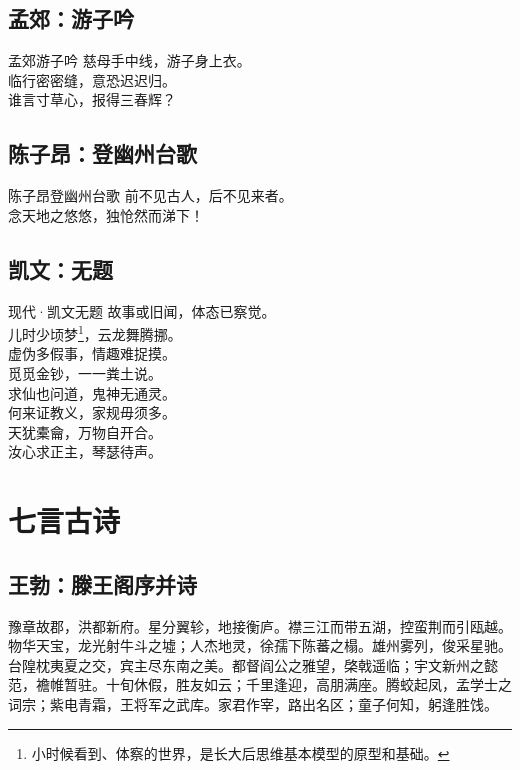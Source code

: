 \documentclass[12pt,oneside,a5paper]{book}
\begin{document}
\chapter{孟郊：游子吟}
\begin{poemzh}{孟郊}{游子吟}
慈母手中线，游子身上衣。\\
临行密密缝，意恐迟迟归。\\
谁言寸草心，报得三春辉？\\ 
\end{poemzh}

\chapter{陈子昂：登幽州台歌}
\begin{poemzh}{陈子昂}{登幽州台歌}
前不见古人，后不见来者。\\
念天地之悠悠，独怆然而涕下！\\ 
\end{poemzh}

\chapter*{凯文：无题}
\begin{poemzh}{现代·凯文}{无题}
故事或旧闻，体态已察觉。\\
儿时少顷梦\footnote[1]{小时候看到、体察的世界，是长大后思维基本模型的原型和基础。}，云龙舞腾挪。\\
虚伪多假事，情趣难捉摸。\\
觅觅金钞，一一粪土说。\\
求仙也问道，鬼神无通灵。\\
何来证教义，家规毋须多。\\
天犹橐龠，万物自开合。\\
汝心求正主，琴瑟待声。\\
\end{poemzh}

\part{七言古诗}

\chapter{王勃：滕王阁序并诗}

豫章故郡，洪都新府。星分翼轸，地接衡庐。襟三江而带五湖，控蛮荆而引瓯越。物华天宝，龙光射牛斗之墟；人杰地灵，徐孺下陈蕃之榻。雄州雾列，俊采星驰。台隍枕夷夏之交，宾主尽东南之美。都督阎公之雅望，棨戟遥临；宇文新州之懿范，襜帷暂驻。十旬休假，胜友如云；千里逢迎，高朋满座。腾蛟起凤，孟学士之词宗；紫电青霜，王将军之武库。家君作宰，路出名区；童子何知，躬逢胜饯。
\end{document}
